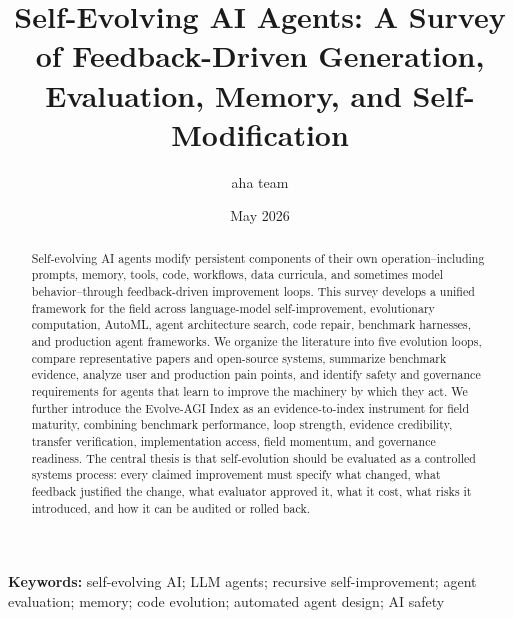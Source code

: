 \documentclass[11pt]{article}
\title{Self-Evolving AI Agents: A Survey of Feedback-Driven Generation, Evaluation, Memory, and Self-Modification}
\author{aha team}
\date{May 2026}
\begin{document}
\maketitle

\begin{abstract}
Self-evolving AI agents modify persistent components of their own operation--including prompts, memory, tools, code, workflows, data curricula, and sometimes model behavior--through feedback-driven improvement loops. This survey develops a unified framework for the field across language-model self-improvement, evolutionary computation, AutoML, agent architecture search, code repair, benchmark harnesses, and production agent frameworks. We organize the literature into five evolution loops, compare representative papers and open-source systems, summarize benchmark evidence, analyze user and production pain points, and identify safety and governance requirements for agents that learn to improve the machinery by which they act. We further introduce the Evolve-AGI Index as an evidence-to-index instrument for field maturity, combining benchmark performance, loop strength, evidence credibility, transfer verification, implementation access, field momentum, and governance readiness. The central thesis is that self-evolution should be evaluated as a controlled systems process: every claimed improvement must specify what changed, what feedback justified the change, what evaluator approved it, what it cost, what risks it introduced, and how it can be audited or rolled back.
\end{abstract}

\noindent\textbf{Keywords:} self-evolving AI; LLM agents; recursive self-improvement; agent evaluation; memory; code evolution; automated agent design; AI safety

\tableofcontents
\newpage










\appendix




\end{document}
